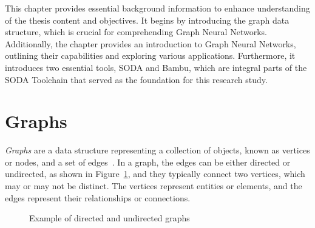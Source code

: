 This chapter provides essential background information to enhance understanding of the thesis content and objectives.
It begins by introducing the graph data structure, which is crucial for comprehending Graph Neural Networks.
Additionally, the chapter provides an introduction to Graph Neural Networks, outlining their capabilities and exploring various applications.
Furthermore, it introduces two essential tools, SODA and Bambu, which are integral parts of the SODA Toolchain that served as the foundation for this research study.

\section{Graphs}
\label{sec:graphs}%

\textit{Graphs} are a data structure representing a collection of objects, known as vertices or nodes, and a set of edges~\cite{DBLP:journals/corr/abs-1812-08434}.
In a graph, the edges can be either directed or undirected, as shown in Figure~\ref{fig:directed_vs_undirected}, and they typically connect two vertices, which may or may not be distinct.
The vertices represent entities or elements, and the edges represent their relationships or connections.

\begin{figure}[b]
    \centering
    \hspace{0.15\textwidth}
    \caption{Example of directed and undirected graphs}
    \label{fig:directed_vs_undirected}
\end{figure}

